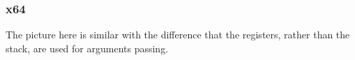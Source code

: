 \subsubsection{x64}

The picture here is similar with the difference that the registers, rather than the stack, are used for arguments passing.







